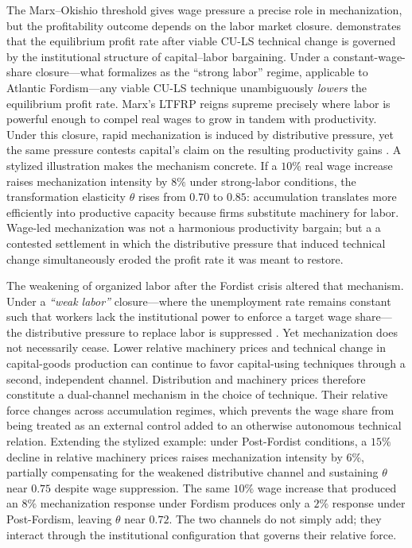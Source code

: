 The Marx--Okishio threshold gives wage pressure a precise role
in mechanization, but the profitability outcome depends on the
labor market closure. \citet{Basu2026} demonstrates that the
equilibrium profit rate after viable CU-LS technical change is
governed by the institutional structure of capital--labor
bargaining. Under a constant-wage-share closure---what
\citet{Basu2026} formalizes as the ``strong labor'' regime,
applicable to Atlantic Fordism---any viable CU-LS technique
unambiguously \textit{lowers} the equilibrium profit rate.
Marx's LTFRP reigns supreme precisely where labor is powerful
enough to compel real wages to grow in tandem with productivity.
Under this closure, rapid mechanization is induced by
distributive pressure, yet the same pressure contests capital's
claim on the resulting productivity gains
\citep{Vidal2015, Vidal2019}. A stylized illustration makes the
mechanism concrete. If a $10\%$ real wage increase raises
mechanization intensity by $8\%$ under strong-labor conditions,
the transformation elasticity $\theta$ rises from $0.70$ to
$0.85$: accumulation translates more efficiently into productive
capacity because firms substitute machinery for labor. Wage-led
mechanization was not a harmonious productivity bargain; but a
a contested settlement in which the distributive pressure that
induced technical change simultaneously eroded the profit rate
it was meant to restore.

The weakening of organized labor after the Fordist crisis
altered that mechanism. Under a \textit{``weak labor''} closure---where
the unemployment rate remains constant such that workers lack the
institutional power to enforce a target wage share---the
distributive pressure to replace labor is suppressed
\citep{Basu2026}. Yet mechanization does not necessarily cease. Lower
relative machinery prices and technical change in capital-goods
production can continue to favor capital-using techniques through a
second, independent channel. Distribution and machinery prices
therefore constitute a dual-channel mechanism in the
choice of technique. Their relative force changes across
accumulation regimes, which prevents the wage share from being
treated as an external control added to an otherwise autonomous
technical relation. Extending the stylized example: under
Post-Fordist conditions, a $15\%$ decline in relative machinery
prices raises mechanization intensity by $6\%$, partially
compensating for the weakened distributive channel and
sustaining $\theta$ near $0.75$ despite wage suppression. The
same $10\%$ wage increase that produced an $8\%$ mechanization
response under Fordism produces only a $2\%$ response under
Post-Fordism, leaving $\theta$ near $0.72$. The two channels do
not simply add; they interact through the institutional
configuration that governs their relative force.

